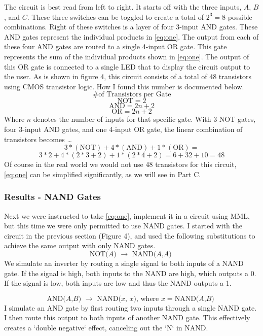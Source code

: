 \documentclass[a4paper,11pt]{article}
\begin{document}
The circuit is best read from left to right. It starts off with the three inputs, $A$, $B$, and $C$. These three switches can be toggled to create a total of $2^3 = 8$ possible combinations. Right of these switches is a layer of four 3-input AND gates. These AND gates represent the individual products in \eqref{eq:one}. The output from each of these four AND gates are routed to a single 4-input OR gate. This gate represents the sum of the individual products shown in \eqref{eq:one}. The output of this OR gate is connected to a single LED that to display the circuit output to the user. As is shown in figure 4, this circuit consists of a total of 48 transistors using CMOS transistor logic. How I found this number is documented below.
\[ \text{\# of Transistors per Gate}\]
\[ \text{NOT} = 2 \]
\[ \text{AND} = 2n+2 \]
\[ \text{OR} = 2n+2 \]
Where $n$ denotes the number of inputs for that specific gate. With 3 NOT gates, four 3-input AND gates, and one 4-input OR gate, the linear combination of transistors becomes \ldots
\[ 3*(\text{NOT})+4*(\text{AND})+1*(\text{OR}) = \]
\[ 3*2+4*(2*3+2)+1*(2*4+2) = 6+32+10 = 48\]
Of course in the real world we would not use 48 transistors for this circuit, \eqref{eq:one} can be simplified significantly, as we will see in Part C.
\par

\subsubsection{Results - NAND Gates}
Next we were instructed to take \eqref{eq:one}, implement it in a circuit using MML, but this time we were only permitted to use NAND gates. I started with the circuit in the previous section (Figure 4), and used the following substitutions to achieve the same output with only NAND gates.
\[ \text{NOT($A$) $\to$ NAND($A$,$A$) }\]
We simulate an inverter by routing a single signal to both inputs of a NAND gate. If the signal is high, both inputs to the NAND are high, which outputs a 0. If the signal is low, both inputs are low and thus the NAND outputs a 1.

\[ \text{AND($A$,$B$) $\to$ NAND($x$, $x$), where $x = $NAND($A$,$B$) } \]
I simulate an AND gate by first routing two inputs through a single NAND gate. I then route this output to both inputs of another NAND gate. This effectively creates a `double negative` effect, canceling out the `N` in NAND.
\end{document}
